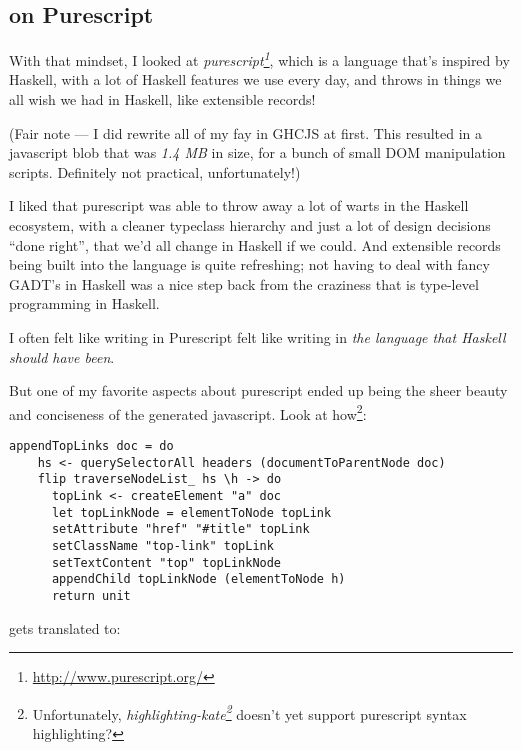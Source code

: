 \documentclass[]{article}
\renewcommand{\href}[2]{#2\footnote{\url{#1}}}
\begin{document}
\subsection{on Purescript}\label{on-purescript}

With that mindset, I looked at
\emph{\href{http://www.purescript.org/}{purescript}}, which is a
language that's inspired by Haskell, with a lot of Haskell features we
use every day, and throws in things we all wish we had in Haskell, like
extensible records!

(Fair note --- I did rewrite all of my fay in GHCJS at first. This
resulted in a javascript blob that was \emph{1.4 MB} in size, for a
bunch of small DOM manipulation scripts. Definitely not practical,
unfortunately!)

I liked that purescript was able to throw away a lot of warts in the
Haskell ecosystem, with a cleaner typeclass hierarchy and just a lot of
design decisions ``done right'', that we'd all change in Haskell if we
could. And extensible records being built into the language is quite
refreshing; not having to deal with fancy GADT's in Haskell was a nice
step back from the craziness that is type-level programming in Haskell.

I often felt like writing in Purescript felt like writing in \emph{the
language that Haskell should have been}.

But one of my favorite aspects about purescript ended up being the sheer
beauty and conciseness of the generated javascript. Look at
how\footnote{Unfortunately,
  \emph{\href{https://github.com/jgm/highlighting-kate}{highlighting-kate}}
  doesn't yet support purescript syntax highlighting?}:

\begin{verbatim}
appendTopLinks doc = do
    hs <- querySelectorAll headers (documentToParentNode doc)
    flip traverseNodeList_ hs \h -> do
      topLink <- createElement "a" doc
      let topLinkNode = elementToNode topLink
      setAttribute "href" "#title" topLink
      setClassName "top-link" topLink
      setTextContent "top" topLinkNode
      appendChild topLinkNode (elementToNode h)
      return unit
\end{verbatim}

gets translated to:
\end{document}
